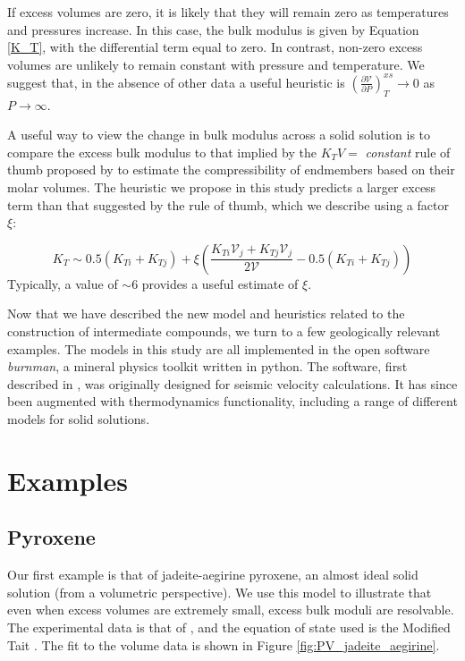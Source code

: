 \documentclass[review]{elsarticle}
\begin{document}
If excess volumes are zero, it is likely that they will remain zero as temperatures and pressures increase. In this case, the bulk modulus is given by Equation \ref{K_T}, with the differential term equal to zero. In contrast, non-zero excess volumes are unlikely to remain constant with pressure and temperature. We suggest that, in the absence of other data a useful heuristic is $\left( \frac{\partial \mathcal{V}}{\partial P} \right)_T^{xs} \rightarrow 0$ as $P \rightarrow \infty$.

A useful way to view the change in bulk modulus across a solid solution is to compare the excess bulk modulus to that implied by the $K_TV =$ \emph{constant} rule of thumb proposed by \cite{AA1970} to estimate the compressibility of endmembers based on their molar volumes. The heuristic we propose in this study predicts a larger excess term than that suggested by the rule of thumb, which we describe using a factor $\xi$:

\begin{equation}
  K_{T} \sim 0.5(K_{Ti} + K_{Tj}) + \xi \left(\frac{K_{Ti}\mathcal{V}_{j} + K_{Tj}\mathcal{V}_{j}}{2 \mathcal{V}} - 0.5(K_{Ti} + K_{Tj})\right)
  \label{K_T_heuristic}
\end{equation}
\noindent Typically, a value of $\sim$6 provides a useful estimate of $\xi$.

Now that we have described the new model and heuristics related to the construction of intermediate compounds, we turn to a few geologically relevant examples. The models in this study are all implemented in the open software \emph{burnman}, a mineral physics toolkit written in python. The software, first described in \cite{CHRU2014}, was originally designed for seismic velocity calculations. It has since been augmented with thermodynamics functionality, including a range of different models for solid solutions.

\section{Examples}
\subsection{Pyroxene}
Our first example is that of jadeite-aegirine pyroxene, an almost ideal solid solution (from a volumetric perspective). We use this model to illustrate that even when excess volumes are extremely small, excess bulk moduli are resolvable. The experimental data is that of \cite{NBLBT2006}, and the equation of state used is the Modified Tait \citep{HP2011}. The fit to the volume data is shown in Figure \ref{fig:PV_jadeite_aegirine}.
\end{document}
